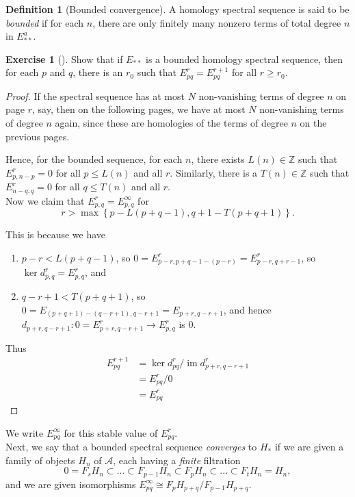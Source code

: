 \documentclass[reqno]{amsart}
\theoremstyle{definition}
\newtheorem{definition}[theorem]{Definition}
\newtheorem{exercise}[theorem]{Exercise}
\theoremstyle{remark}
\DeclareMathOperator{\im}{im}
\begin{document}
\begin{definition}[Bounded convergence]
    A homology spectral sequence is said to be
    \textit{bounded} if for each $n$, there
    are only finitely many nonzero terms of total
    degree $n$ in $E_{* *}^{a}$.

    \begin{exercise}[]
        Show that if
        $E_{* *}$ is a bounded homology
        spectral sequence, then
        for each $p$ and $q$, there is an $r_0$ such that
    $E_{pq}^{r} = E_{pq}^{r+1}$ for all $r \ge r_0$.
    \end{exercise}
    \begin{proof}
        If the spectral sequence has at most 
        $N$ non-vanishing terms of degree $n$ on page
        $r$, say, then on the following pages,
        we have at most $N$ non-vanishing terms of degree
        $n$ again, since these are homologies of
        the terms of degree $n$ on the previous pages.

        Hence, for the bounded sequence, for each
        $n$, there exists $L (n) \in \mathbb{Z}$ such that
        $E_{p, n-p}^{r} = 0$ for all $p \le L(n)$ and all
        $r$.
        Similarly, there is a $T(n) \in \mathbb{Z}$ such that
        $E_{n-q,q}^{r} = 0$ for all $q \le T(n)$ and all
        $r$.\\
        Now we claim that
        $E^{r}_{p,q} = E_{p,q}^{\infty}$ for
         \[
        r> \max \left\{ p - L(p+q-1), q+1 - T(p+q+1) \right\} .
        \] 

        This is because
        we have
        \begin{enumerate}
            \item $p-r < L(p+q-1)$, so
                $0 = E_{p-r, p+q-1 - (p-r)}^{r} = 
                E^{r}_{p-r, q+r-1}$, so
                $\ker d_{p,q}^{r} = E_{p,q}^{r}$, and
            \item $q-r+1 < T(p+q+1)$, so
                $0 = 
                E_{(p+q+1)-(q-r+1),q-r+1} = E_{p+r, q-r+1}$,
                and hence $d_{p+r,q-r+1} \colon
                0 = E_{p+r,q-r+1}^{r} \to E_{p,q}^{r}$ is $0$.
        \end{enumerate}
        Thus
        \begin{align*}
            E_{pq}^{r+1} 
            &= \ker d_{pq}^{r} / \im d_{p+r,q-r+1}^{r}\\
            &= E_{pq}^{r} / 0\\
            &= E_{pq}^{r}
        \end{align*}
    \end{proof}
    We write
    $E_{pq}^{\infty}$ for this stable value of
    $E_{pq}^{r}$.\\
    \linebreak
    Next, we say that a bounded spectral sequence
    \textit{converges} to $H_*$ if we are given
    a family of objects $H_n$ of $\mathcal{A}$, each
    having a \textit{finite} filtration
    \[
    0 = F_s H_n \subset \ldots \subset 
    F_{p-1} H_n \subset F_p H_n \subset \ldots
    \subset 
    F_t H_n = H_n,
    \] 
    and we are given isomorphisms
    $E_{pq}^{\infty} \cong
    F_p H_{p+q} / F_{p-1} H_{p+q}$.


\end{definition}
\end{document}
